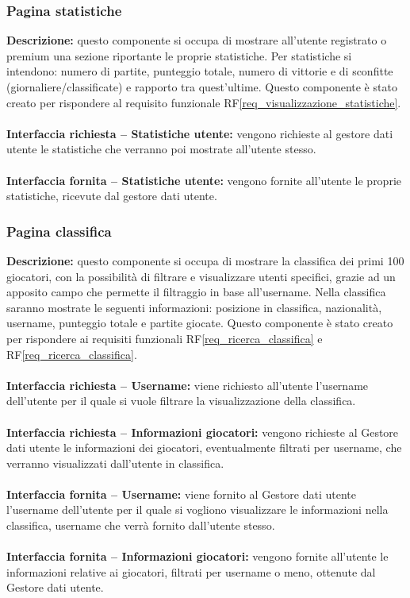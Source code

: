 \subsubsection{Pagina statistiche}
\textbf{Descrizione:} questo componente si occupa di mostrare all’utente registrato o premium una sezione riportante le proprie statistiche. Per statistiche si intendono: numero di partite, punteggio totale, numero di vittorie e di sconfitte (giornaliere/classificate) e rapporto tra quest’ultime. Questo componente è stato creato per rispondere al requisito funzionale RF\ref{req_visualizzazione_statistiche}. \\
\\
\textbf{Interfaccia richiesta – Statistiche utente:} vengono richieste al gestore dati utente le statistiche che verranno poi mostrate all’utente stesso. \\
\\
\textbf{Interfaccia fornita – Statistiche utente:} vengono fornite all’utente le proprie statistiche, ricevute dal gestore dati utente. \\

\subsubsection{Pagina classifica}
\textbf{Descrizione:} questo componente si occupa di mostrare la classifica dei primi 100 giocatori, con la possibilità di filtrare e visualizzare utenti specifici, grazie ad un apposito campo che permette il filtraggio in base all’username. Nella classifica saranno mostrate le seguenti informazioni: posizione in classifica, nazionalità, username, punteggio totale e partite giocate. Questo componente è stato creato per rispondere ai requisiti funzionali RF\ref{req_ricerca_classifica} e RF\ref{req_ricerca_classifica}. \\
\\
\textbf{Interfaccia richiesta – Username:} viene richiesto all’utente l’username dell’utente per il quale si vuole filtrare la visualizzazione della classifica. \\
\\
\textbf{Interfaccia richiesta – Informazioni giocatori:} vengono richieste al Gestore dati utente le informazioni dei giocatori, eventualmente filtrati per username, che verranno visualizzati dall’utente in classifica. \\
\\
\textbf{Interfaccia fornita – Username:} viene fornito al Gestore dati utente l’username dell’utente per il quale si vogliono visualizzare le informazioni nella classifica, username che verrà fornito dall’utente stesso. \\
\\
\textbf{Interfaccia fornita – Informazioni giocatori:} vengono fornite all’utente le informazioni relative ai giocatori, filtrati per username o meno, ottenute dal Gestore dati utente.

